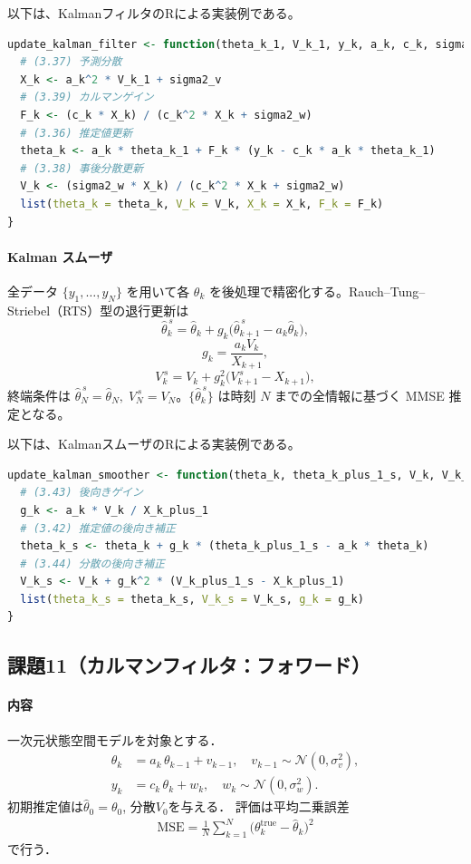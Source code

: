 以下は、KalmanフィルタのRによる実装例である。

\begin{lstlisting}[language=R,caption={Kalmanフィルタ更新（式(3.36)–(3.39)）}]
update_kalman_filter <- function(theta_k_1, V_k_1, y_k, a_k, c_k, sigma2_v, sigma2_w) {
  # (3.37) 予測分散
  X_k <- a_k^2 * V_k_1 + sigma2_v
  # (3.39) カルマンゲイン
  F_k <- (c_k * X_k) / (c_k^2 * X_k + sigma2_w)
  # (3.36) 推定値更新
  theta_k <- a_k * theta_k_1 + F_k * (y_k - c_k * a_k * theta_k_1)
  # (3.38) 事後分散更新
  V_k <- (sigma2_w * X_k) / (c_k^2 * X_k + sigma2_w)
  list(theta_k = theta_k, V_k = V_k, X_k = X_k, F_k = F_k)
}
\end{lstlisting}

\paragraph{Kalman スムーザ}
全データ $\{y_1,\dots,y_N\}$ を用いて各 $\theta_k$ を後処理で精密化する。Rauch–Tung–Striebel（RTS）型の退行更新は
\[
\hat\theta_k^{\,s}=\hat\theta_k + g_k\bigl(\hat\theta_{k+1}^{\,s}-a_k\hat\theta_k\bigr),\tag{3.42}
\]
\[
g_k=\frac{a_k V_k}{X_{k+1}},\tag{3.43}
\]
\[
V_k^{\,s}=V_k + g_k^2\bigl(V_{k+1}^{\,s}-X_{k+1}\bigr),\tag{3.44}
\]
終端条件は $\hat\theta_N^{\,s}=\hat\theta_N,\;V_N^{\,s}=V_N$。$\{\hat\theta_k^{\,s}\}$ は時刻 $N$ までの全情報に基づく MMSE 推定となる\cite{exp2025}。

以下は、KalmanスムーザのRによる実装例である。

\begin{lstlisting}[language=R,caption={Kalmanスムーザ更新（式(3.42)–(3.44)）}]
update_kalman_smoother <- function(theta_k, theta_k_plus_1_s, V_k, V_k_plus_1_s, X_k_plus_1, a_k) {
  # (3.43) 後向きゲイン
  g_k <- a_k * V_k / X_k_plus_1
  # (3.42) 推定値の後向き補正
  theta_k_s <- theta_k + g_k * (theta_k_plus_1_s - a_k * theta_k)
  # (3.44) 分散の後向き補正
  V_k_s <- V_k + g_k^2 * (V_k_plus_1_s - X_k_plus_1)
  list(theta_k_s = theta_k_s, V_k_s = V_k_s, g_k = g_k)
}
\end{lstlisting}

\subsection{課題11（カルマンフィルタ：フォワード）}
\label{subsec:task11}

\paragraph{内容}
一次元状態空間モデルを対象とする．
\begin{align}
  \theta_k &= a_k\,\theta_{k-1} + v_{k-1}, \quad v_{k-1}\sim \mathcal{N}(0,\sigma_v^2),\\
  y_k &= c_k\,\theta_k + w_k, \quad w_k\sim \mathcal{N}(0,\sigma_w^2).
\end{align}
初期推定値は$\hat{\theta}_0=\theta_0$, 分散$V_0$を与える．
評価は平均二乗誤差
\begin{align}
  \mathrm{MSE}=\frac{1}{N}\sum_{k=1}^{N}\bigl(\theta_k^{\mathrm{true}}-\hat{\theta}_k\bigr)^2
\end{align}
で行う．

